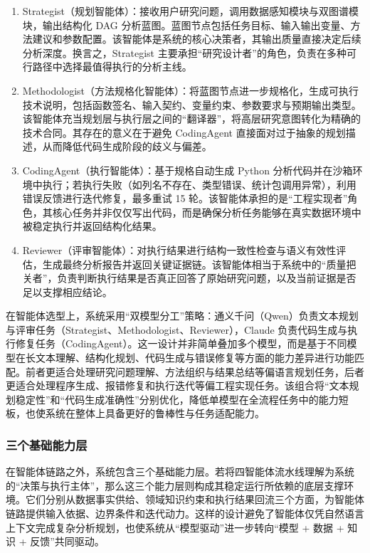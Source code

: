 \begin{enumerate}[(1)]
\item Strategist（规划智能体）：接收用户研究问题，调用数据感知模块与双图谱模块，输出结构化 DAG 分析蓝图。蓝图节点包括任务目标、输入输出变量、方法建议和参数配置。该智能体是系统的核心决策者，其输出质量直接决定后续分析深度。换言之，Strategist 主要承担“研究设计者”的角色，负责在多种可行路径中选择最值得执行的分析主线。
\item Methodologist（方法规格化智能体）：将蓝图节点进一步规格化，生成可执行技术说明，包括函数签名、输入契约、变量约束、参数要求与预期输出类型。该智能体充当规划层与执行层之间的“翻译器”，将高层研究意图转化为精确的技术合同。其存在的意义在于避免 CodingAgent 直接面对过于抽象的规划描述，从而降低代码生成阶段的歧义与偏差。
\item CodingAgent（执行智能体）：基于规格自动生成 Python 分析代码并在沙箱环境中执行；若执行失败（如列名不存在、类型错误、统计包调用异常），利用错误反馈进行迭代修复，最多重试 15 轮。该智能体承担的是“工程实现者”角色，其核心任务并非仅仅写出代码，而是确保分析任务能够在真实数据环境中被稳定执行并返回结构化结果。
\item Reviewer（评审智能体）：对执行结果进行结构一致性检查与语义有效性评估，生成最终分析报告并返回关键证据链。该智能体相当于系统中的“质量把关者”，负责判断执行结果是否真正回答了原始研究问题，以及当前证据是否足以支撑相应结论。
\end{enumerate}

在智能体选型上，系统采用“双模型分工”策略：通义千问（Qwen）负责文本规划与评审任务（Strategist、Methodologist、Reviewer），Claude 负责代码生成与执行修复任务（CodingAgent）\cite{zhao2024llm,brown2020language}。这一设计并非简单叠加多个模型，而是基于不同模型在长文本理解、结构化规划、代码生成与错误修复等方面的能力差异进行功能匹配。前者更适合处理研究问题理解、方法组织与结果总结等偏语言规划任务，后者更适合处理程序生成、报错修复和执行迭代等偏工程实现任务。该组合将“文本规划稳定性”和“代码生成准确性”分别优化，降低单模型在全流程任务中的能力短板，也使系统在整体上具备更好的鲁棒性与任务适配能力。

\subsubsection{三个基础能力层}

在智能体链路之外，系统包含三个基础能力层。若将四智能体流水线理解为系统的“决策与执行主体”，那么这三个能力层则构成其稳定运行所依赖的底层支撑环境。它们分别从数据事实供给、领域知识约束和执行结果回流三个方面，为智能体链路提供输入依据、边界条件和迭代动力。这样的设计避免了智能体仅凭自然语言上下文完成复杂分析规划，也使系统从“模型驱动”进一步转向“模型 + 数据 + 知识 + 反馈”共同驱动。

